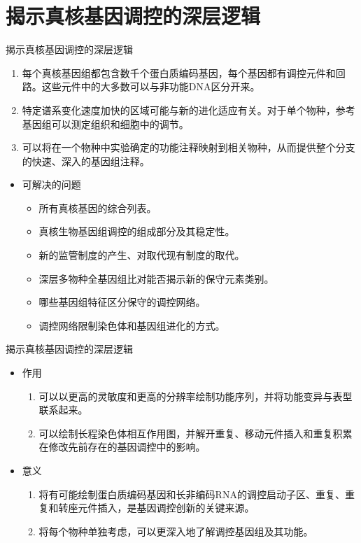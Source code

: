 \documentclass{beamer}
\begin{document}
	\section{揭示真核基因调控的深层逻辑}
	\begin{frame}{揭示真核基因调控的深层逻辑}
		\begin{multicols}{2}
			\begin{enumerate}
				\item 每个真核基因组都包含数千个蛋白质编码基因，每个基因都有调控元件和回路。这些元件中的大多数可以与非功能DNA区分开来。
				\item 特定谱系变化速度加快的区域可能与新的进化适应有关。对于单个物种，参考基因组可以测定组织和细胞中的调节。
				\item 可以将在一个物种中实验确定的功能注释映射到相关物种，从而提供整个分支的快速、深入的基因组注释。
			\end{enumerate}
			\begin{itemize}
				\item 可解决的问题
				\begin{itemize}
				\item 所有真核基因的综合列表。
				\item 真核生物基因组调控的组成部分及其稳定性。
				\item 新的监管制度的产生、对取代现有制度的取代。
				\item 深层多物种全基因组比对能否揭示新的保守元素类别。
				\item 哪些基因组特征区分保守的调控网络。
				\item 调控网络限制染色体和基因组进化的方式。
				\end{itemize}
			\end{itemize}
		\end{multicols}
	\end{frame}


	\begin{frame}{揭示真核基因调控的深层逻辑}
		\begin{itemize}
			\item 作用
			\begin{enumerate}
				\item 可以以更高的灵敏度和更高的分辨率绘制功能序列，并将功能变异与表型联系起来。
				\item 可以绘制长程染色体相互作用图，并解开重复、移动元件插入和重复积累在修改先前存在的基因调控中的影响。
			\end{enumerate}

			\quad

			\item 意义
			\begin{enumerate}
				\item 将有可能绘制蛋白质编码基因和长非编码RNA的调控启动子区、重复、重复和转座元件插入，是基因调控创新的关键来源。
				\item 将每个物种单独考虑，可以更深入地了解调控基因组及其功能。
			\end{enumerate}
		\end{itemize}
	\end{frame}
\end{document}
